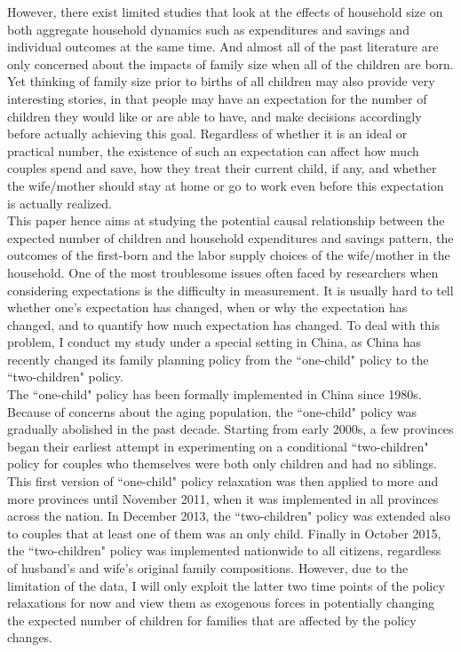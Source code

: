 \documentclass[12pt]{extarticle}
\begin{document}
\indent However, there exist limited studies that look at the effects of household size on both aggregate household dynamics such as expenditures and savings and individual outcomes at the same time. And almost all of the past literature are only concerned about the impacts of family size when all of the children are born. Yet thinking of family size prior to births of all children may also provide very interesting stories, in that people may have an expectation for the number of children they would like or are able to have, and make decisions accordingly before actually achieving this goal. Regardless of whether it is an ideal or practical number, the existence of such an expectation can affect how much couples spend and save, how they treat their current child, if any, and whether the wife/mother should stay at home or go to work even before this expectation is actually realized. \\
\indent This paper hence aims at studying the potential causal relationship between the expected number of children and household expenditures and savings pattern, the outcomes of the first-born and the labor supply choices of the wife/mother in the household. One of the most troublesome issues often faced by researchers when considering expectations is the difficulty in measurement. It is usually hard to tell whether one's expectation has changed, when or why the expectation has changed, and to quantify how much expectation has changed. To deal with this problem, I conduct my study under a special setting in China, as China has recently changed its family planning policy from the ``one-child" policy to the ``two-children" policy. \\
\indent The ``one-child" policy has been formally implemented in China since 1980s. Because of concerns about the aging population, the ``one-child" policy was gradually abolished in the past decade. Starting from early 2000s, a few provinces began their earliest attempt in experimenting on a conditional ``two-children" policy for couples who themselves were both only children and had no siblings. This first version of ``one-child" policy relaxation was then applied to more and more provinces until November 2011, when it was implemented in all provinces across the nation. In December 2013, the ``two-children" policy was extended also to couples that at least one of them was an only child. Finally in October 2015, the ``two-children" policy was implemented nationwide to all citizens, regardless of husband's and wife's original family compositions. However, due to the limitation of the data, I will only exploit the latter two time points of the policy relaxations for now and view them as exogenous forces in potentially changing the expected number of children for families that are affected by the policy changes. \\
\end{document}
